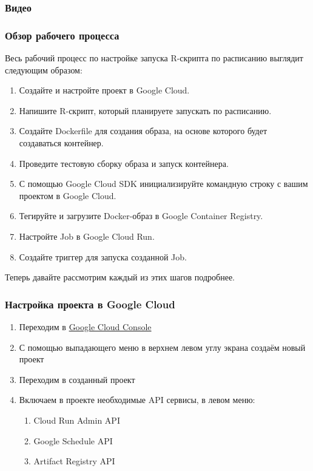 \documentclass[
]{book}
\providecommand{\tightlist}{%
  \setlength{\itemsep}{0pt}\setlength{\parskip}{0pt}}
\begin{document}
\subsubsection{Видео}\label{ux432ux438ux434ux435ux43e}

\subsubsection{Обзор рабочего процесса}\label{ux43eux431ux437ux43eux440-ux440ux430ux431ux43eux447ux435ux433ux43e-ux43fux440ux43eux446ux435ux441ux441ux430-1}

Весь рабочий процесс по настройке запуска R-скрипта по расписанию выглядит следующим образом:

\begin{enumerate}
\def\labelenumi{\arabic{enumi}.}
\tightlist
\item
  Создайте и настройте проект в Google Cloud.
\item
  Напишите R-скрипт, который планируете запускать по расписанию.
\item
  Создайте Dockerfile для создания образа, на основе которого будет создаваться контейнер.
\item
  Проведите тестовую сборку образа и запуск контейнера.
\item
  С помощью Google Cloud SDK инициализируйте командную строку с вашим проектом в Google Cloud.
\item
  Тегируйте и загрузите Docker-образ в Google Container Registry.
\item
  Настройте Job в Google Cloud Run.
\item
  Создайте триггер для запуска созданной Job.
\end{enumerate}

Теперь давайте рассмотрим каждый из этих шагов подробнее.

\subsubsection{Настройка проекта в Google Cloud}\label{ux43dux430ux441ux442ux440ux43eux439ux43aux430-ux43fux440ux43eux435ux43aux442ux430-ux432-google-cloud}

\begin{enumerate}
\def\labelenumi{\arabic{enumi}.}
\tightlist
\item
  Переходим в \href{https://console.cloud.google.com/welcome}{Google Cloud Console}
\item
  С помощью выпадающего меню в верхнем левом углу экрана создаём новый проект
\item
  Переходим в созданный проект
\item
  Включаем в проекте необходимые API сервисы, в левом меню:

  \begin{enumerate}
  \def\labelenumii{\arabic{enumii}.}
  \tightlist
  \item
    Cloud Run Admin API
  \item
    Google Schedule API
  \item
    Artifact Registry API
  \end{enumerate}
\end{enumerate}
\end{document}
